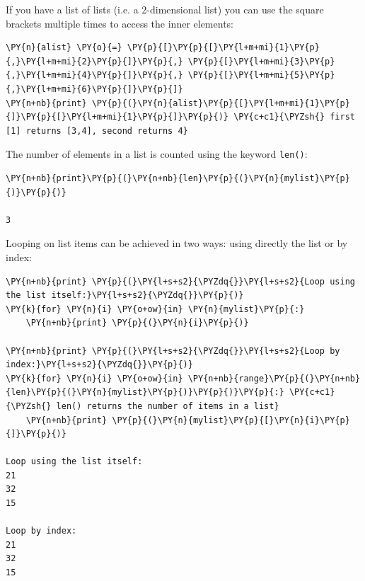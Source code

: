 If you have a list of lists (i.e. a 2-dimensional list) you can use the square brackets multiple times to access the inner elements:
\begin{tcolorbox}[breakable, size=fbox, boxrule=1pt, pad at break*=1mm,colback=cellbackground, colframe=cellborder]
\begin{Verbatim}[commandchars=\\\{\}]                 
\PY{n}{alist} \PY{o}{=} \PY{p}{[}\PY{p}{[}\PY{l+m+mi}{1}\PY{p}{,}\PY{l+m+mi}{2}\PY{p}{]}\PY{p}{,} \PY{p}{[}\PY{l+m+mi}{3}\PY{p}{,}\PY{l+m+mi}{4}\PY{p}{]}\PY{p}{,} \PY{p}{[}\PY{l+m+mi}{5}\PY{p}{,}\PY{l+m+mi}{6}\PY{p}{]}\PY{p}{]}       
\PY{n+nb}{print} \PY{p}{(}\PY{n}{alist}\PY{p}{[}\PY{l+m+mi}{1}\PY{p}{]}\PY{p}{[}\PY{l+m+mi}{1}\PY{p}{]}\PY{p}{)} \PY{c+c1}{\PYZsh{} first [1] returns [3,4], second returns 4}                   
\end{Verbatim} 
\end{tcolorbox}  

The number of elements in a list is counted using the keyword \texttt{len()}:
\begin{tcolorbox}[breakable, size=fbox, boxrule=1pt, pad at break*=1mm, colback=cellbackground, colframe=cellborder]
\begin{Verbatim}[commandchars=\\\{\}]
\PY{n+nb}{print}\PY{p}{(}\PY{n+nb}{len}\PY{p}{(}\PY{n}{mylist}\PY{p}{)}\PY{p}{)}

3
\end{Verbatim}
\end{tcolorbox}

Looping on list items can be achieved in two ways: using directly the list or by index:

\begin{tcolorbox}[breakable, size=fbox, boxrule=1pt, pad at break*=1mm, colback=cellbackground, colframe=cellborder]
\begin{Verbatim}[commandchars=\\\{\}]
\PY{n+nb}{print} \PY{p}{(}\PY{l+s+s2}{\PYZdq{}}\PY{l+s+s2}{Loop using the list itself:}\PY{l+s+s2}{\PYZdq{}}\PY{p}{)}
\PY{k}{for} \PY{n}{i} \PY{o+ow}{in} \PY{n}{mylist}\PY{p}{:}
    \PY{n+nb}{print} \PY{p}{(}\PY{n}{i}\PY{p}{)}

\PY{n+nb}{print} \PY{p}{(}\PY{l+s+s2}{\PYZdq{}}\PY{l+s+s2}{Loop by index:}\PY{l+s+s2}{\PYZdq{}}\PY{p}{)}
\PY{k}{for} \PY{n}{i} \PY{o+ow}{in} \PY{n+nb}{range}\PY{p}{(}\PY{n+nb}{len}\PY{p}{(}\PY{n}{mylist}\PY{p}{)}\PY{p}{)}\PY{p}{:} \PY{c+c1}{\PYZsh{} len() returns the number of items in a list}
    \PY{n+nb}{print} \PY{p}{(}\PY{n}{mylist}\PY{p}{[}\PY{n}{i}\PY{p}{]}\PY{p}{)}

Loop using the list itself:
21
32
15

Loop by index:
21
32
15
\end{Verbatim}
\end{tcolorbox}

